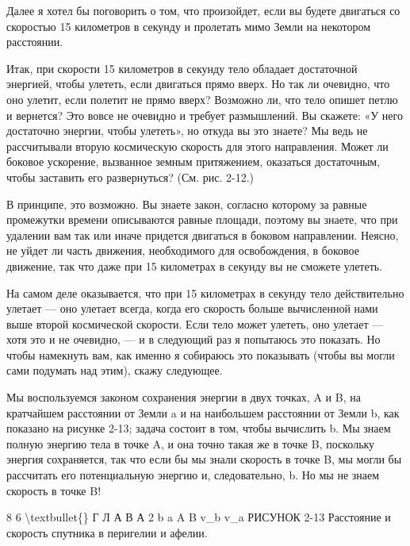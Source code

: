 \documentclass[10pt,oneside]{article}
\begin{document}
Далее я хотел бы поговорить о том, что произойдет, если вы будете двигаться со скоростью 15 километров в секунду и пролетать мимо Земли на некотором расстоянии.\par

Итак, при скорости 15 километров в секунду тело обладает достаточной энергией, чтобы улететь, если двигаться прямо вверх. Но так ли очевидно, что оно улетит, если полетит не прямо вверх? Возможно ли, что тело опишет петлю и вернется? Это вовсе не очевидно и требует размышлений. Вы скажете: «У него достаточно энергии, чтобы улететь», но откуда вы это знаете? Мы ведь не рассчитывали вторую космическую скорость для этого направления. Может ли боковое ускорение, вызванное земным притяжением, оказаться достаточным, чтобы заставить его развернуться? (См. рис. 2-12.)\par

В принципе, это возможно. Вы знаете закон, согласно которому за равные промежутки времени описываются равные площади, поэтому вы знаете, что при удалении вам так или иначе придется двигаться в боковом направлении. Неясно, не уйдет ли часть движения, необходимого для освобождения, в боковое движение, так что даже при 15 километрах в секунду вы не сможете улететь.\par

На самом деле оказывается, что при 15 километрах в секунду тело действительно улетает --- оно улетает всегда, когда его скорость больше вычисленной нами выше второй космической скорости. Если тело может улететь, оно улетает --- хотя это и не очевидно, --- и в следующий раз я попытаюсь это показать. Но чтобы намекнуть вам, как именно я собираюсь это показывать (чтобы вы могли сами подумать над этим), скажу следующее.\par

Мы воспользуемся законом сохранения энергии в двух точках, A и B, на кратчайшем расстоянии от Земли a и на наибольшем расстоянии от Земли b, как показано на рисунке 2-13; задача состоит в том, чтобы вычислить b. Мы знаем полную энергию тела в точке A, и она точно такая же в точке B, поскольку энергия сохраняется, так что если бы мы знали скорость в точке B, мы могли бы рассчитать его потенциальную энергию и, следовательно, b. Но мы не знаем скорость в точке B!\par

8 6 \textbackslash{}textbullet\{\} Г Л А В А  2 b a A B v\_b v\_a РИСУНОК 2-13 Расстояние и скорость спутника в перигелии и афелии.\par
\end{document}
